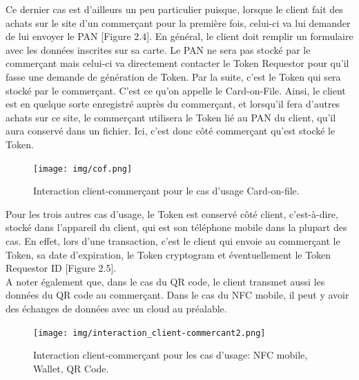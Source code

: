 \documentclass{report}
\begin{document}
\noindent
Ce dernier cas est d'ailleurs un peu particulier puisque, lorsque le client fait des achats sur le site d'un commerçant pour la première fois, celui-ci va lui demander de lui envoyer le PAN [Figure 2.4]. En général, le client doit remplir un formulaire avec les données inscrites sur sa carte. Le PAN ne sera pas stocké par le commerçant mais celui-ci va directement contacter le Token Requestor pour qu'il fasse une demande de génération de Token. Par la suite, c'est le Token qui sera stocké par le commerçant. C'est ce qu'on appelle le Card-on-File. Ainsi, le client est en quelque sorte enregistré auprès du commerçant, et lorsqu'il fera d'autres achats sur ce site, le commerçant utilisera le Token lié au PAN du client, qu'il aura conservé dans un fichier. Ici, c'est donc côté commerçant qu'est stocké le Token.\\

\begin{figure}[!ht]
    \centering
			\texttt{[image: img/cof.png]}
			\caption{\label{CardOnFile} Interaction client-commerçant pour le cas d'usage Card-on-file.}			
\end{figure}

Pour les trois autres cas d'usage, le Token est conservé côté client, c'est-à-dire, stocké dans l'appareil du client, qui est son téléphone mobile dans la plupart des cas. En effet, lors d'une transaction, c'est le client qui envoie au commerçant le Token, sa date d'expiration, le Token cryptogram et éventuellement le Token Requestor ID [Figure 2.5].\\
A noter également que, dans le cas du QR code, le client transmet aussi les données du QR code au commerçant. Dans le cas du NFC mobile, il peut y avoir des échanges de données avec un cloud au préalable.

\begin{figure}[!ht]
    \centering
			\texttt{[image: img/interaction\_client-commercant2.png]}
			\caption{\label{ClientCommerçant} Interaction client-commerçant pour les cas d'usage: NFC mobile, Wallet, QR Code.}			
\end{figure}
\end{document}
